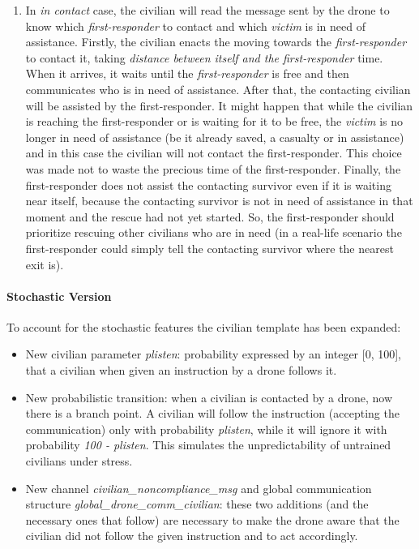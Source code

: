 \begin{enumerate}
\begin{enumerate}
		\item In \textit{in contact} case, the civilian will read the message sent by the drone to know which \textit{first-responder} to contact and which \textit{victim} is in need of assistance. Firstly, the civilian enacts the moving towards the \textit{first-responder} to contact it, taking \textit{distance between itself and the first-responder} time. When it arrives, it waits until the \textit{first-responder} is free and then communicates who is in need of assistance. After that, the contacting civilian will be assisted by the first-responder.\newline
		It might happen that while the civilian is reaching the first-responder or is waiting for it to be free, the \textit{victim} is no longer in need of assistance (be it already saved, a casualty or in assistance) and in this case the civilian will not contact the first-responder. This choice was made not to waste the precious time of the first-responder. Finally, the first-responder does not assist the contacting survivor even if it is waiting near itself, because the contacting survivor is not in need of assistance in that moment and the rescue had not yet started. So, the first-responder should prioritize rescuing other civilians who are in need (in a real-life scenario the first-responder could simply tell the contacting survivor where the nearest exit is).
	\end{enumerate}
\end{enumerate}


\paragraph{Stochastic Version}
To account for the stochastic features the civilian template has been expanded:
\begin{itemize}
	\item New civilian parameter \textit{plisten}: probability expressed by an integer [0, 100], that a civilian when given an instruction by a drone follows it.
	\item New probabilistic transition: when a civilian is contacted by a drone, now there is a branch point. A civilian will follow the instruction (accepting the communication) only with probability \textit{plisten}, while it will ignore it with probability \textit{100 - plisten}. This simulates the unpredictability of untrained civilians under stress.
	\item New channel \textit{civilian\_noncompliance\_msg} and global communication structure \textit{global\_drone\_comm\_civilian}: these two additions (and the necessary ones that follow) are necessary to make the drone aware that the civilian did not follow the given instruction and to act accordingly.
\end{itemize}
	
